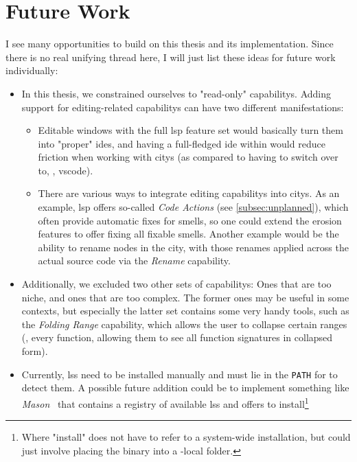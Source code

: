 \documentclass[../thesis]{subfiles}
\begin{document}
\section{Future Work}
I see many opportunities to build on this thesis and its implementation.
Since there is no real unifying thread here, I will just list these ideas for future work individually:
\begin{itemize}
	\item In this thesis, we constrained ourselves to "read-only" \glspl{capability}.
	      Adding support for editing-related \glspl{capability} can have two different manifestations:
	      \begin{itemize}
		      \item Editable \glspl{window} with the full \gls{lsp} feature set would basically turn them into "proper" \glspl{ide}, and having a full-fledged \gls{ide} within \SEE{} would reduce friction when working with \glspl{city} (as compared to having to switch over to, \eg, \gls{vscode}).
		      \item There are various ways to integrate editing \glspl{capability} into \glspl{city}.
		            As an example, \gls{lsp} offers so-called \emph{Code Actions} (see \cref{subsec:unplanned}), which often provide automatic fixes for \glspl{smell}, so one could extend the erosion features to offer fixing all fixable \glspl{smell}.
		            Another example would be the ability to rename nodes in the \gls{city}, with those renames applied across the actual source code via the \emph{Rename} \gls{capability}.
	      \end{itemize}
	\item Additionally, we excluded two other sets of \glspl{capability}:
	      Ones that are too niche, and ones that are too complex.
	      The former ones may be useful in some contexts, but especially the latter set contains some very handy tools, such as the \emph{Folding Range} \gls{capability}, which allows the user to collapse certain ranges (\eg, every function, allowing them to see all function signatures in collapsed form).
	\item Currently, \glspl{ls} need to be installed manually and must lie in the \texttt{PATH} for \SEE{} to detect them.
	      A possible future addition could be to implement something like \emph{Mason}~\cite{boman2025} that contains a registry of available \glspl{ls} and offers to install\footnote{
		      Where "install" does not have to refer to a system-wide installation, but could just involve placing the binary into a \SEE{}-local folder.
}
\end{itemize}
\end{document}
